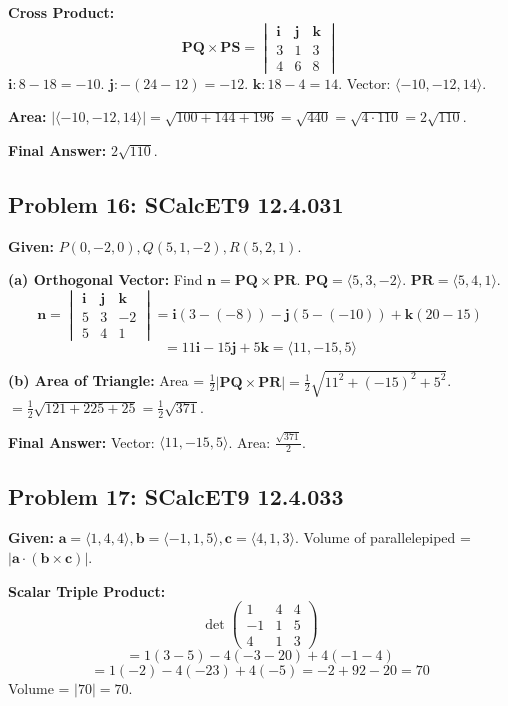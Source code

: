 \documentclass[11pt]{article}
\renewcommand{\vec}[1]{\mathbf{#1}}
\newcommand{\ihat}{\mathbf{i}}
\newcommand{\jhat}{\mathbf{j}}
\newcommand{\khat}{\mathbf{k}}
\begin{document}
\textbf{Cross Product:}
\[
\vec{PQ} \times \vec{PS} = \begin{vmatrix} \ihat & \jhat & \khat \\ 3 & 1 & 3 \\ 4 & 6 & 8 \end{vmatrix}
\]
$\ihat: 8 - 18 = -10$.
$\jhat: -(24 - 12) = -12$.
$\khat: 18 - 4 = 14$.
Vector: $\langle -10, -12, 14 \rangle$.

\textbf{Area:}
$|\langle -10, -12, 14 \rangle| = \sqrt{100 + 144 + 196} = \sqrt{440} = \sqrt{4 \cdot 110} = 2\sqrt{110}$.

\textbf{Final Answer:} $2\sqrt{110}$.

\hrulefill

\subsection*{Problem 16: SCalcET9 12.4.031}
\textbf{Given:} $P(0, -2, 0), Q(5, 1, -2), R(5, 2, 1)$.

\textbf{(a) Orthogonal Vector:} Find $\vec{n} = \vec{PQ} \times \vec{PR}$.
$\vec{PQ} = \langle 5, 3, -2 \rangle$.
$\vec{PR} = \langle 5, 4, 1 \rangle$.
\[
\vec{n} = \begin{vmatrix} \ihat & \jhat & \khat \\ 5 & 3 & -2 \\ 5 & 4 & 1 \end{vmatrix} = \ihat(3 - (-8)) - \jhat(5 - (-10)) + \khat(20 - 15)
\]
\[
= 11\ihat - 15\jhat + 5\khat = \langle 11, -15, 5 \rangle
\]

\textbf{(b) Area of Triangle:}
Area = $\frac{1}{2} |\vec{PQ} \times \vec{PR}| = \frac{1}{2} \sqrt{11^2 + (-15)^2 + 5^2}$.
$= \frac{1}{2} \sqrt{121 + 225 + 25} = \frac{1}{2} \sqrt{371}$.

\textbf{Final Answer:}
Vector: $\langle 11, -15, 5 \rangle$. Area: $\frac{\sqrt{371}}{2}$.

\hrulefill

\subsection*{Problem 17: SCalcET9 12.4.033}
\textbf{Given:} $\vec{a} = \langle 1, 4, 4 \rangle, \vec{b} = \langle -1, 1, 5 \rangle, \vec{c} = \langle 4, 1, 3 \rangle$.
Volume of parallelepiped = $|\vec{a} \cdot (\vec{b} \times \vec{c})|$.

\textbf{Scalar Triple Product:}
\[
\det \begin{pmatrix} 1 & 4 & 4 \\ -1 & 1 & 5 \\ 4 & 1 & 3 \end{pmatrix}
\]
\[
= 1(3 - 5) - 4(-3 - 20) + 4(-1 - 4)
\]
\[
= 1(-2) - 4(-23) + 4(-5) = -2 + 92 - 20 = 70
\]
Volume = $|70| = 70$.
\end{document}
